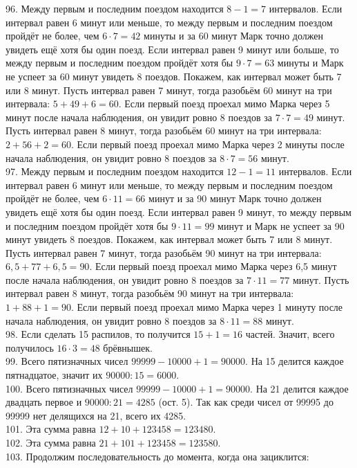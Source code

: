 \documentclass[12pt]{article}
\begin{document}
96. Между первым и последним поездом находится $8-1=7$ интервалов. Если интервал равен 6 минут или меньше, то между первым и последним поездом пройдёт не более, чем $6\cdot7=42$ минуты и за 60 минут Марк точно должен увидеть ещё хотя бы один поезд. Если интервал равен 9 минут или больше, то между первым и последним поездом пройдёт хотя бы $9\cdot7=63$ минуты и Марк не успеет за 60 минут увидеть 8 поездов. Покажем, как интервал может быть 7 или 8 минут. Пусть интервал равен 7 минут, тогда разобьём 60 минут на три интервала: $5+49+6=60.$ Если первый поезд проехал мимо Марка через 5 минут после начала наблюдения, он увидит ровно 8 поездов за $7\cdot7=49$ минут. Пусть интервал равен 8 минут, тогда разобьём 60 минут на три интервала: $2+56+2=60.$ Если первый поезд проехал мимо Марка через 2 минуты после начала наблюдения, он увидит ровно 8 поездов за $8\cdot7=56$ минут.\\
97. Между первым и последним поездом находится $12-1=11$ интервалов. Если интервал равен 6 минут или меньше, то между первым и последним поездом пройдёт не более, чем $6\cdot11=66$ минут и за 90 минут Марк точно должен увидеть ещё хотя бы один поезд. Если интервал равен 9 минут, то между первым и последним поездом пройдёт хотя бы $9\cdot11=99$ минут и Марк не успеет за 90 минут увидеть 8 поездов. Покажем, как интервал может быть 7 или 8 минут. Пусть интервал равен 7 минут, тогда разобьём 90 минут на три интервала: $6,5+77+6,5=90.$ Если первый поезд проехал мимо Марка через 6,5 минут после начала наблюдения, он увидит ровно 8 поездов за $7\cdot11=77$ минут. Пусть интервал равен 8 минут, тогда разобьём 90 минут на три интервала: $1+88+1=90.$ Если первый поезд проехал мимо Марка через 1 минуту после начала наблюдения, он увидит ровно 8 поездов за $8\cdot11=88$ минут.\\
98. Если сделать 15 распилов, то получится $15+1=16$ частей. Значит, всего получилось $16\cdot3=48$ брёвнышек.\\
99. Всего пятизначных чисел $99999-10000+1=90000.$ На 15 делится каждое пятнадцатое, значит их $90000:15=6000.$\\
100. Всего пятизначных чисел $99999-10000+1=90000.$ На 21 делится каждое двадцать первое и $90000:21=4285$ (ост. 5). Так как среди чисел от 99995 до 99999 нет делящихся на 21, всего их 4285.\\
101. Эта сумма равна $12+10+123458=123480.$\\
102. Эта сумма равна $21+101+123458=123580.$\\
103. Продолжим последовательность до момента, когда она зациклится:
\end{document}
